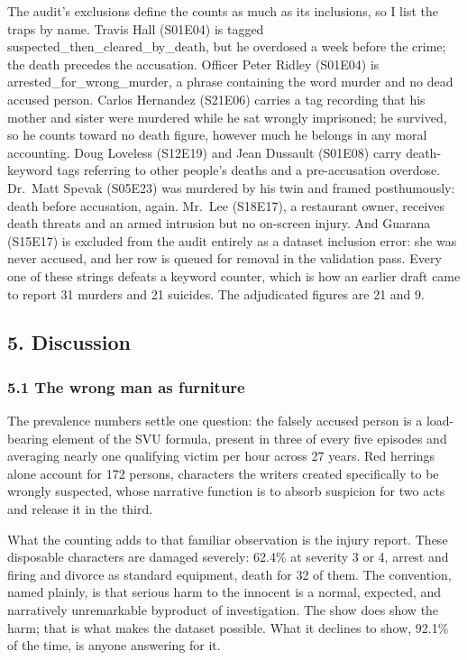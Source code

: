 \documentclass[
]{article}
\begin{document}
The audit's exclusions define the counts as much as its inclusions, so I
list the traps by name. Travis Hall (S01E04) is tagged
suspected\_then\_cleared\_by\_death, but he overdosed a week before the
crime; the death precedes the accusation. Officer Peter Ridley (S01E04)
is arrested\_for\_wrong\_murder, a phrase containing the word murder and
no dead accused person. Carlos Hernandez (S21E06) carries a tag
recording that his mother and sister were murdered while he sat wrongly
imprisoned; he survived, so he counts toward no death figure, however
much he belongs in any moral accounting. Doug Loveless (S12E19) and Jean
Dussault (S01E08) carry death-keyword tags referring to other people's
deaths and a pre-accusation overdose. Dr.~Matt Spevak (S05E23) was
murdered by his twin and framed posthumously: death before accusation,
again. Mr.~Lee (S18E17), a restaurant owner, receives death threats and
an armed intrusion but no on-screen injury. And Guarana (S15E17) is
excluded from the audit entirely as a dataset inclusion error: she was
never accused, and her row is queued for removal in the validation pass.
Every one of these strings defeats a keyword counter, which is how an
earlier draft came to report 31 murders and 21 suicides. The adjudicated
figures are 21 and 9.

\subsection{5. Discussion}\label{discussion}

\subsubsection{5.1 The wrong man as
furniture}\label{the-wrong-man-as-furniture}

The prevalence numbers settle one question: the falsely accused person
is a load-bearing element of the SVU formula, present in three of every
five episodes and averaging nearly one qualifying victim per hour across
27 years. Red herrings alone account for 172 persons, characters the
writers created specifically to be wrongly suspected, whose narrative
function is to absorb suspicion for two acts and release it in the
third.

What the counting adds to that familiar observation is the injury
report. These disposable characters are damaged severely: 62.4\% at
severity 3 or 4, arrest and firing and divorce as standard equipment,
death for 32 of them. The convention, named plainly, is that serious
harm to the innocent is a normal, expected, and narratively unremarkable
byproduct of investigation. The show does show the harm; that is what
makes the dataset possible. What it declines to show, 92.1\% of the
time, is anyone answering for it.
\end{document}
